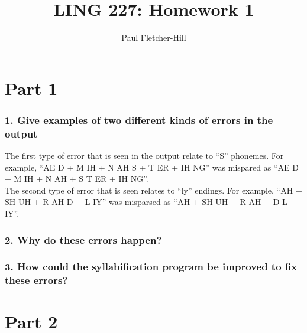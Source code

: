 \documentclass[a4paper,10pt]{article}
\newcommand{\br}{\\[10pt]}
\begin{document}
  \title{LING 227: Homework 1}
  \author{Paul Fletcher-Hill}
  \maketitle


  \section*{Part 1}
  \subsubsection*{1. Give examples of two different kinds of errors in the output}
  The first type of error that is seen in the output relate to ``S'' phonemes. For example, ``AE D + M IH + N AH S + T ER + IH NG'' was mispared as ``AE D + M IH + N AH + S T ER + IH NG''.
  \br
  The second type of error that is seen relates to ``ly'' endings. For example, ``AH + SH UH + R AH D + L IY'' was misparsed as ``AH + SH UH + R AH + D L IY''.

  \subsubsection*{2. Why do these errors happen?}


  \subsubsection*{3. How could the syllabification program be improved to fix these errors?}
  
  \section*{Part 2}
  
\end{document}

